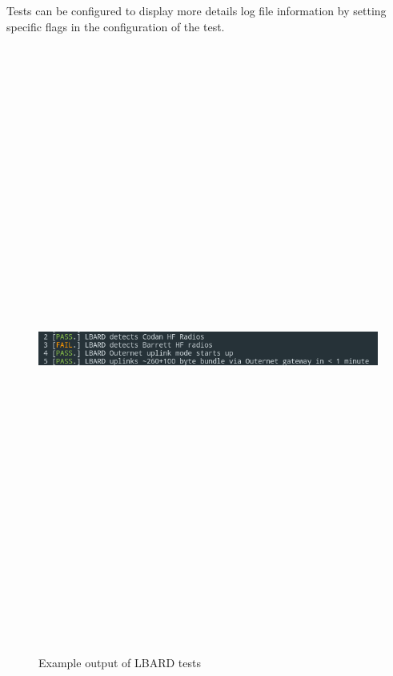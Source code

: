 Tests can be configured to display more details log file information by setting specific flags in the configuration of the test.

\begin{figure}
    \begin{centering}
        \includegraphics[width=14cm,height=20cm,keepaspectratio]{Figures/testOutput1.png}
        \caption{Example output of LBARD tests}
        \label{fig:exampleTest}
    \end{centering}
\end{figure}


